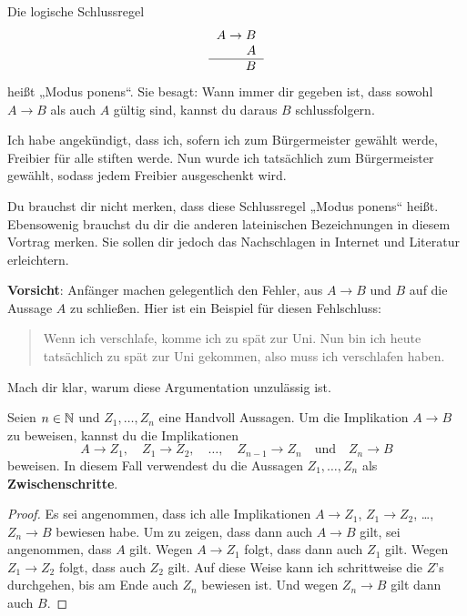 \begin{axiom} \label{modusponens} 
    Die logische Schlussregel
    \[\begin{tabular}{r}
        $A\to B$ \\
        $A$ \\
        \hline
        $B$
   \end{tabular}\]
    heißt „Modus ponens“. Sie besagt: Wann immer dir gegeben ist, dass sowohl $A\to B$ als auch $A$ gültig sind, kannst du daraus $B$ schlussfolgern.
\end{axiom}


\begin{bsp}
    Ich habe angekündigt, dass ich, sofern ich zum Bürgermeister gewählt werde, Freibier für alle stiften werde. Nun wurde ich tatsächlich zum Bürgermeister gewählt, sodass jedem Freibier ausgeschenkt wird.
\end{bsp}


\begin{bem}
    Du brauchst dir nicht merken, dass diese Schlussregel „Modus ponens“ heißt. Ebensowenig brauchst du dir die anderen lateinischen Bezeichnungen in diesem Vortrag merken. Sie sollen dir jedoch das Nachschlagen in Internet und Literatur erleichtern.
\end{bem}


\begin{bem}
    \textbf{Vorsicht}: Anfänger machen gelegentlich den Fehler, aus $A\to B$ und $B$ auf die Aussage $A$ zu schließen. Hier ist ein Beispiel für diesen Fehlschluss:
    \begin{quote}
        Wenn ich verschlafe, komme ich zu spät zur Uni. Nun bin ich heute tatsächlich zu spät zur Uni gekommen, also muss ich verschlafen haben.
    \end{quote}
    Mach dir klar, warum diese Argumentation unzulässig ist.
\end{bem}


\begin{satz} \label{implikationtrans}
    Seien $n\in \mathbb N$ und $Z_1,\dots , Z_n$ eine Handvoll Aussagen. Um die Implikation $A\to B$ zu beweisen, kannst du die Implikationen
        \[ A\to Z_1,\quad Z_1\to Z_2,\quad \dots ,\quad Z_{n-1}\to Z_n\quad \text{und}\quad Z_n\to B \]
    beweisen. In diesem Fall verwendest du die Aussagen $Z_1,\dots , Z_n$ als \textbf{Zwischenschritte}.
\end{satz}
\begin{proof}
    Es sei angenommen, dass ich alle Implikationen $A\to Z_1$, $Z_1\to Z_2$, \dots , $Z_n\to B$ bewiesen habe. Um zu zeigen, dass dann auch $A\to B$ gilt, sei angenommen, dass $A$ gilt. Wegen $A\to Z_1$ folgt, dass dann auch $Z_1$ gilt. Wegen $Z_1\to Z_2$ folgt, dass auch $Z_2$ gilt. Auf diese Weise kann ich schrittweise die $Z$'s durchgehen, bis am Ende auch $Z_n$ bewiesen ist. Und wegen $Z_n\to B$ gilt dann auch $B$.
\end{proof}


